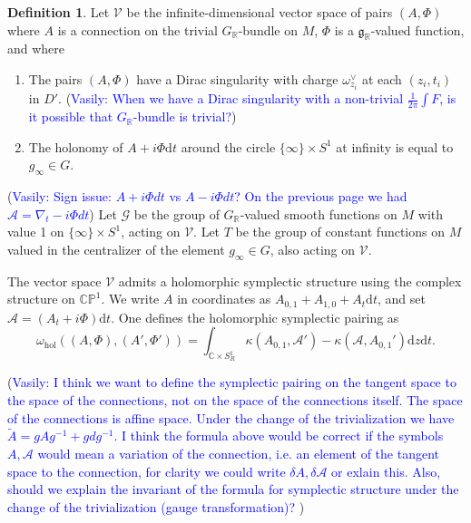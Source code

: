 \documentclass[11pt, oneside, reqno]{amsart}
\theoremstyle{definition} \newtheorem{definition}{Definition}[section]
\theoremstyle{definition} \newtheorem{remark}[definition]{Remark}
\theoremstyle{definition} \newtheorem{remarks}[definition]{Remarks}
\theoremstyle{definition} \newtheorem{question}[definition]{Question}
\theoremstyle{definition} \newtheorem*{note}{Note}
\theoremstyle{definition} \newtheorem{example}[definition]{Example}
\theoremstyle{definition} \newtheorem{examples}[definition]{Examples}
\renewcommand{\gg}{\mathfrak{g}}
\newcommand{\bb}[1]{\mathbb{#1}}
\newcommand{\mr}[1]{\mathrm{#1}}
\newcommand{\mc}[1]{\mathcal{#1}}
\newcommand{\CC}{\mathbb{C}}
\newcommand{\RR}{\mathbb{R}}
\renewcommand{\d}{\mathrm{d}}
\newcommand{\vasily}[1]{(\textcolor{blue}{Vasily: #1})}
\begin{document}
\begin{definition}
Let $\mc V$ be the infinite-dimensional vector space of pairs $(A,\Phi)$ where $A$ is a connection on the trivial $G_\RR$-bundle on $M$, $\Phi$ is a $\gg_\RR$-valued function, and where 
\begin{enumerate}
\item The pairs $(A,\Phi)$ have a Dirac singularity with charge $\omega^\vee_{z_i}$ at each $(z_i,t_i)$ in $D'$.
    \vasily{When we have a Dirac singularity with a non-trivial $\frac{1}{2\pi}
    \int F$, is it possible that $G_{\mathbb{R}}$-bundle is trivial?}
 \item The holonomy of $A + i \Phi \d t$ around the circle $\{\infty\} \times S^1$ at infinity is equal to $g_\infty \in G$. 
\end{enumerate}
\vasily{Sign issue:  $A + i \Phi dt$ vs $ A - i \Phi dt$? On the previous
page we had $\mathcal{A} = \nabla_{t} -i \Phi dt$}
  Let $\mc G$ be the group of $G_\RR$-valued smooth functions on $M$ with value 1 on $\{\infty\} \times S^1$, acting on $\mc V$.  Let $T$ be the group of constant functions on $M$ valued in the centralizer of the element $g_\infty \in G$, also acting on $\mc V$.
\end{definition}

The vector space $\mc V$ admits a holomorphic symplectic structure using the complex structure on $\bb{CP}^1$.  We write $A$ in coordinates as $A_{0,1} + A_{1,0}  + A_t \d t$, and set $\mc A = (A_t + i \Phi) \d t$. One defines the holomorphic symplectic pairing as
\begin{equation}
 \label{holo_symp_structure_fields}
 \omega_{\mr{hol}}((A,\Phi), (A',\Phi')) = \int_{\CC \times S^1_R} \kappa(A_{0,1}, \mc A') - \kappa(\mc A, A_{0,1}') \d z \d t.
\end{equation}

\vasily{I think we want to define the symplectic
  pairing on the tangent space to the space of the connections,
  not on the space of the connections itself. 
  The space of the connections is affine space. Under the change of the trivialization we have $ \tilde A  = g  A g^{-1} + g d g^{-1}$. I think
  the formula above would be correct if the symbols $A, \mathcal{A}$
  would mean a variation of the connection, i.e. an element of the tangent
  space to the connection, for clarity we could write $\delta A, \delta \mathcal{A}$ or exlain this. Also, should we explain the invariant of the
  formula for symplectic structure under the change of the trivialization (gauge transformation)? }
\end{document}
